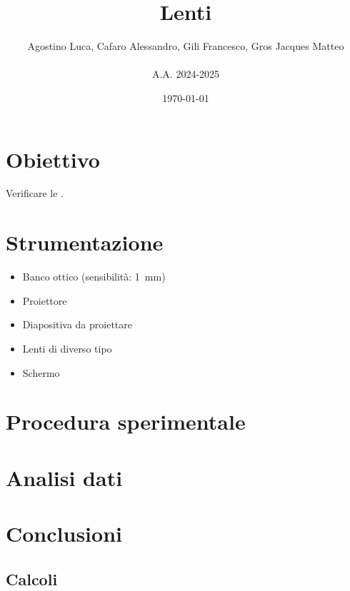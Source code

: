 \documentclass[a4paper]{article}
\title{Lenti}
\author{Agostino Luca, Cafaro Alessandro, Gili Francesco, Gros Jacques Matteo\\ \\A.A. 2024-2025}
\date{\today}
\begin{document}
    
\maketitle

\tableofcontents
\newpage

\section{Obiettivo}
    Verificare le .
\section{Strumentazione}
    \begin{itemize}
        \item Banco ottico (sensibilità: \SI{1}{\mm})
        \item Proiettore
        \item Diapositiva da proiettare
        \item Lenti di diverso tipo
        \item Schermo
    \end{itemize}
\section{Procedura sperimentale}
    
\section{Analisi dati}
\section{Conclusioni}
\begin{appendices}
    \section{Calcoli}
\end{appendices}
\end{document}
